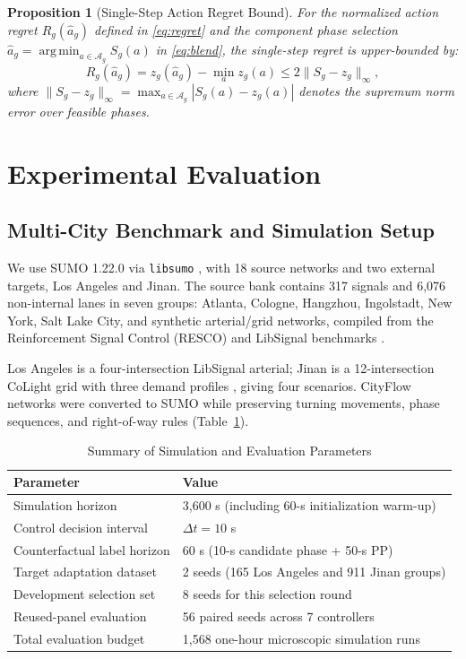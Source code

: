 \documentclass[letterpaper,journal]{IEEEtran}
\DeclareMathOperator*{\argmin}{arg\,min}
\newtheorem{proposition}{Proposition}
\begin{document}
\begin{proposition}[Single-Step Action Regret Bound]
\label{prop:regret_bound}
For the normalized action regret $R_g(\widehat a_g)$ defined in \eqref{eq:regret} and the component phase selection $\widehat a_g = \argmin_{a\in\mathcal A_g} S_g(a)$ in \eqref{eq:blend}, the single-step regret is upper-bounded by:
\begin{equation}
 R_g(\widehat a_g)=z_g(\widehat a_g)-\min_a z_g(a)
 \leq2\|S_g-z_g\|_\infty,
 \label{eq:score-regret-bound}
\end{equation}
where $\|S_g-z_g\|_\infty = \max_{a\in\mathcal A_g}|S_g(a)-z_g(a)|$ denotes the supremum norm error over feasible phases.
\end{proposition}

\section{Experimental Evaluation}
\label{sec:experiments}

\subsection{Multi-City Benchmark and Simulation Setup}
We use SUMO 1.22.0 via \texttt{libsumo} \cite{lopez2018microscopic}, with 18 source networks and two external targets, Los Angeles and Jinan. The source bank contains 317 signals and 6,076 non-internal lanes in seven groups: Atlanta, Cologne, Hangzhou, Ingolstadt, New York, Salt Lake City, and synthetic arterial/grid networks, compiled from the Reinforcement Signal Control (RESCO) and LibSignal benchmarks \cite{ault2021reinforcement,mei2022libsignal}.

Los Angeles is a four-intersection LibSignal arterial; Jinan is a 12-intersection CoLight grid with three demand profiles \cite{wei2019colight}, giving four scenarios. CityFlow networks \cite{zhang2019cityflow} were converted to SUMO while preserving turning movements, phase sequences, and right-of-way rules (Table~\ref{tab:hyperparams}).

\begin{table}[!t]
\centering
\caption{Summary of Simulation and Evaluation Parameters}
\label{tab:hyperparams}
\begin{tabular}{@{}lp{}@{}}
\toprule
Parameter & Value\\
\midrule
Simulation horizon & 3,600 s (including 60-s initialization warm-up)\\
Control decision interval & $\Delta t = 10$ s\\
Counterfactual label horizon & 60 s (10-s candidate phase + 50-s PP)\\
Target adaptation dataset & 2 seeds (165 Los Angeles and 911 Jinan groups)\\
Development selection set & 8 seeds for this selection round\\
Reused-panel evaluation & 56 paired seeds across 7 controllers\\
Total evaluation budget & 1,568 one-hour microscopic simulation runs\\
\bottomrule
\end{tabular}
\end{table}
\end{document}
